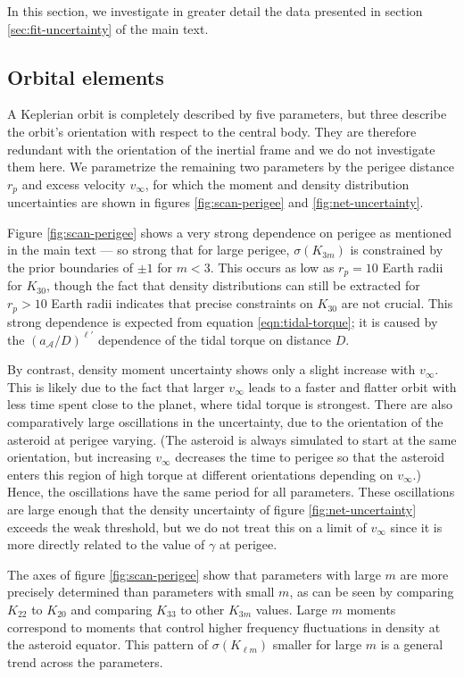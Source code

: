 In this section, we investigate in greater detail the data presented in section \ref{sec:fit-uncertainty} of the main text.

\subsection{Orbital elements}
\label{sec:scan-orbit}
A Keplerian orbit is completely described by five parameters, but three describe the orbit's orientation with respect to the central body. They are therefore redundant with the orientation of the inertial frame and we do not investigate them here. We parametrize the remaining two parameters by the perigee distance $r_p$ and excess velocity $v_\infty$, for which the moment and density distribution uncertainties are shown in figures \ref{fig:scan-perigee} and \ref{fig:net-uncertainty}.

Figure \ref{fig:scan-perigee} shows a very strong dependence on perigee as mentioned in the main text --- so strong that for large perigee, $\sigma(K_{3m})$ is constrained by the prior boundaries of $\pm 1$ for $m < 3$. This occurs as low as $r_p = 10$ Earth radii for $K_{30}$, though the fact that density distributions can still be extracted for $r_p > 10$ Earth radii indicates that precise constraints on $K_{30}$ are not crucial. This strong dependence is expected from equation \ref{eqn:tidal-torque}; it is caused by the $(a_\mathcal{A}/D)^{\ell'}$ dependence of the tidal torque on distance $D$.

By contrast, density moment uncertainty shows only a slight increase with $v_\infty$. This is likely due to the fact that larger $v_\infty$ leads to a faster and flatter orbit with less time spent close to the planet, where tidal torque is strongest. There are also comparatively large oscillations in the uncertainty, due to the orientation of the asteroid at perigee varying. (The asteroid is always simulated to start at the same orientation, but increasing $v_\infty$ decreases the time to perigee so that the asteroid enters this region of high torque at different orientations depending on $v_\infty$.) Hence, the oscillations have the same period for all parameters. These oscillations are large enough that the density uncertainty of figure \ref{fig:net-uncertainty} exceeds the weak threshold, but we do not treat this on a limit of $v_\infty$ since it is more directly related to the value of $\gamma$ at perigee.

The axes of figure \ref{fig:scan-perigee} show that parameters with large $m$ are more precisely determined than parameters with small $m$, as can be seen by comparing $K_{22}$ to $K_{20}$ and comparing $K_{33}$ to other $K_{3m}$ values. Large $m$ moments correspond to moments that control higher frequency fluctuations in density at the asteroid equator. This pattern of $\sigma(K_{\ell m})$ smaller for large $m$ is a general trend across the parameters.


